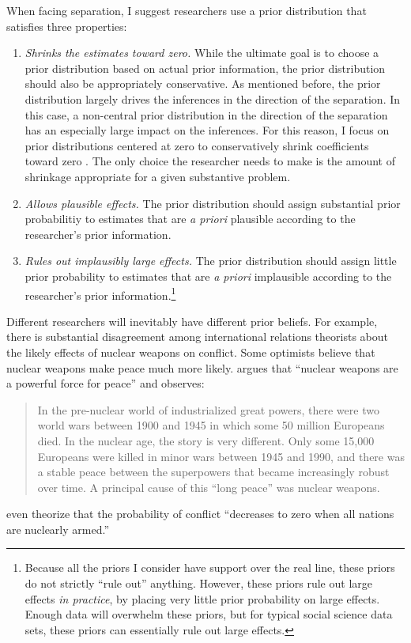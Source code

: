 \documentclass[12pt]{article}
\begin{document}
When facing separation, I suggest researchers use a prior distribution that satisfies three properties:
\begin{enumerate}
\item \emph{Shrinks the estimates toward zero.} 
While the ultimate goal is to choose a prior distribution based on actual prior information, the prior distribution should also be appropriately conservative.
As mentioned before, the prior distribution largely drives the inferences in the direction of the separation. 
In this case, a non-central prior distribution in the direction of the separation has an especially large impact on the inferences. 
For this reason, I focus on prior distributions centered at zero to conservatively shrink coefficients toward zero \citep{GelmanJakulin2007}. 
The only choice the researcher needs to make is the amount of shrinkage appropriate for a given substantive problem.
\item \emph{Allows plausible effects.} 
The prior distribution should assign substantial prior probabilitiy to estimates that are \textit{a priori} plausible according to the researcher's prior information.
\item \emph{Rules out implausibly large effects.} 
The prior distribution should assign little prior probability to estimates that are \textit{a priori} implausible according to the researcher's prior information.\footnote{
Because all the priors I consider have support over the real line, these priors do not strictly ``rule out'' anything. 
However, these priors rule out large effects \textit{in practice}, by placing very little prior probability on large effects.
 Enough data will overwhelm these priors, but for typical social science data sets, these priors can essentially rule out large effects.}
\end{enumerate}

Different researchers will inevitably have different prior beliefs. 
For example, there is substantial disagreement among international relations theorists about the likely effects of nuclear weapons on conflict. 
Some optimists believe that nuclear weapons make peace much more likely. 
\citet[p. 57]{Mearsheimer1993} argues that ``nuclear weapons are a powerful force for peace'' and observes:
\begin{quote}
In the pre-nuclear world of industrialized great powers, there were two world wars between 1900 and 1945 in which some 50 million Europeans died. In the nuclear age, the story is very different. Only some 15,000 Europeans were killed in minor wars between 1945 and 1990, and there was a stable peace between the superpowers that became increasingly robust over time. A principal cause of this ``long peace'' was nuclear weapons.
\end{quote}
\citet[p. 283]{BDMRiker1982} even theorize that the probability of conflict ``decreases to zero when all nations are nuclearly armed.'' 
\end{document}
